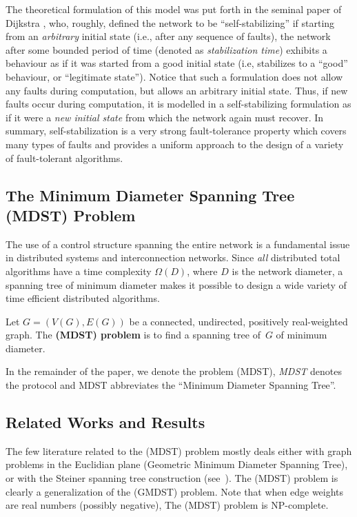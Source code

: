 \documentclass[10pt]{article}
\begin{document}
The theoretical formulation of this model was put forth in the seminal
paper of Dijkstra \cite{Dijk74}, who, roughly, defined the network to
be ``self-stabilizing'' if starting from an {\em arbitrary} initial
state (i.e., after any sequence of faults), the network after some
bounded period of time (denoted as {\em stabilization time}) exhibits
a behaviour as if it was started from a good initial state (i.e,
stabilizes to a ``good'' behaviour, or ``legitimate state''). Notice
that such a formulation does not allow any faults during computation,
but allows an arbitrary initial state. Thus, if new faults occur
during computation, it is modelled in a self-stabilizing formulation
as if it were a {\em new initial state} from which the network again
must recover.
In summary, self-stabilization is a very strong fault-tolerance
property which covers many types of faults and provides a uniform approach
to the design of a variety of fault-tolerant algorithms.

\subsection{The Minimum Diameter Spanning Tree (MDST) Problem}\label{mdstprob}
The use of a control structure spanning the entire network is a
fundamental issue in distributed systems and interconnection networks.
Since {\em all} distributed total algorithms have a time complexity
$\Omega(D)$, where $D$ is the network diameter, a spanning tree of
minimum diameter makes it possible to design a wide variety of time
efficient distributed algorithms.

Let $G=(V(G),E(G))$ be a connected, undirected, positively real-weighted
graph. The {\bf (MDST) problem} is to find a spanning tree of~$G$ of
minimum diameter.

In the remainder of the paper, we denote the problem (MDST), {\em
MDST} denotes the protocol and MDST abbreviates the ``Minimum Diameter
Spanning Tree''.

\subsection{Related Works and Results}
The few literature related to the (MDST) problem mostly deals
either with graph problems in the Euclidian plane (Geometric Minimum
Diameter Spanning Tree), or with the Steiner spanning tree
construction (see~\cite{HLCW91,IhRW91}). The (MDST) problem is clearly
a generalization of the (GMDST) problem. Note that when edge weights are
real numbers (possibly negative), The (MDST) problem is NP-complete.
\end{document}
